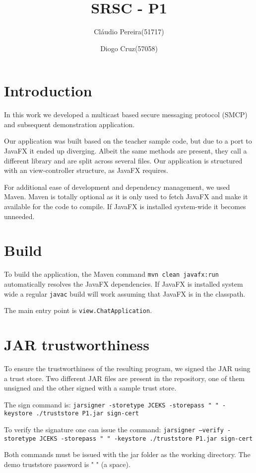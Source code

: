 \documentclass[runningheads]{llncs}
\title{SRSC - P1}
\author{Cláudio Pereira(51717) \and Diogo Cruz(57058)}
\institute{Faculdade de Ciências e Tecnologia\\Universidade Nova de Lisboa}
\begin{document}
\maketitle
\pagebreak
\section{Introduction}
In this work we developed a multicast based secure messaging protocol (SMCP) and subsequent demonstration application.

Our application was built based on the teacher sample code, but due to a port to JavaFX it ended up diverging. Albeit the same methods are present, they call a different library and are split across several files. Our application is structured with an view-controller structure, as JavaFX requires.

For additional ease of development and dependency management, we used Maven. Maven is totally optional as it is only used to fetch JavaFX and make it available for the code to compile. If JavaFX is installed system-wide it becomes unneeded.

\section{Build}
To build the application, the Maven command \texttt{mvn clean javafx:run} automatically resolves the JavaFX dependencies. If JavaFX is installed system wide a regular \texttt{javac} build will work assuming that JavaFX is in the classpath.

The main entry point is \texttt{view.ChatApplication}.

\section{JAR trustworthiness}
To ensure the trustworthiness of the resulting program, we signed the JAR using a trust store. Two different JAR files are present in the repository, one of them unsigned and the other signed with a sample trust store.

The sign command is:
\texttt{jarsigner -storetype JCEKS  -storepass " " -keystore ./truststore P1.jar sign-cert}

To verify the signature one can issue the command:
\texttt{jarsigner --verify -storetype JCEKS  -storepass " " -keystore ./truststore P1.jar sign-cert}

Both commands must be issued with the jar folder as the working directory. The  demo truststore password is " " (a space).
\clearpage
\end{document}
